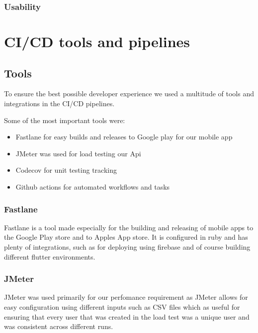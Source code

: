 \documentclass[a4paper]{article}
\begin{document}
\subsubsection{Usability}


\newpage

\section{CI/CD tools and pipelines}

\subsection{Tools}

To ensure the best possible developer experience we used a multitude of tools and integrations
in the CI/CD pipelines. \newline

Some of the most important tools were:
\begin{itemize}
    \item Fastlane for easy builds and releases to Google play for our mobile app
    \item JMeter was used for load testing our Api
    \item Codecov for unit testing tracking
    \item Github actions for automated workflows and tasks
\end{itemize}

\subsubsection{Fastlane}

Fastlane is a tool made especially for the building and releasing of mobile apps to the Google 
Play store and to Apples App store. It is configured in ruby and has plenty of integrations,
such as for deploying using firebase and of course building different flutter environments.


\subsubsection{JMeter}

JMeter was used primarily for our perfomance requirement as JMeter allows for easy configuration
using different inputs such as CSV files which as useful for ensuring that every user that 
was created in the load test was a unique user and was consistent across different runs.
\end{document}

